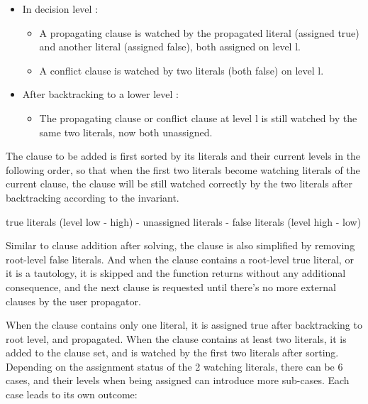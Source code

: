 \begin{itemize}
  \item In decision level :
  \begin{itemize}
    \item A propagating clause is watched by the propagated literal (assigned true) and another literal (assigned false), both assigned on level l.
    \item A conflict clause is watched by two literals (both false) on level l.
  \end{itemize}
  \item After backtracking to a lower level :
  \begin{itemize}
    \item The propagating clause or conflict clause at level l is still watched by the same two literals, now both unassigned.
  \end{itemize}
\end{itemize}

The clause to be added is first sorted by its literals and their current levels in the following order, so that when the first two literals become watching literals of the current clause, the clause will be still watched correctly by the two literals after backtracking according to the invariant.

\begin{center}
  true literals (level low - high) - unassigned literals - false literals (level high - low)
\end{center}

Similar to clause addition after solving, the clause is also simplified by removing root-level false literals. And when the clause contains a root-level true literal, or it is a tautology, it is skipped and the function returns without any additional consequence, and the next clause is requested until there's no more external clauses by the user propagator.

When the clause contains only one literal, it is assigned true after backtracking to root level, and propagated. When the clause contains at least two literals, it is added to the clause set, and is watched by the first two literals after sorting. Depending on the assignment status of the 2 watching literals, there can be 6 cases, and their levels when being assigned can introduce more sub-cases. Each case leads to its own outcome:

